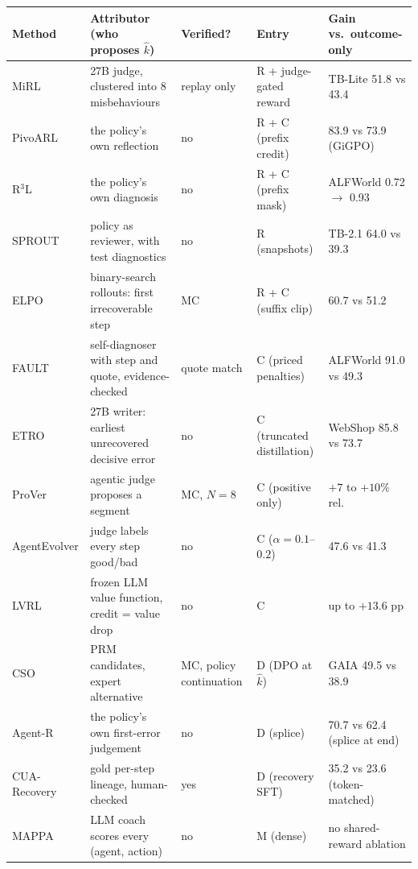 \documentclass[10pt,a4paper]{article}
\begin{document}
\begin{table}[h]\centering\scriptsize
\setlength{\tabcolsep}{3pt}
\begin{tabularx}{\linewidth}{@{}l >{\RaggedRight\hsize=1.05\hsize}X l >{\RaggedRight\hsize=0.95\hsize}X l@{}}\toprule
Method & Attributor (who proposes $\hat k$) & Verified? & Entry & Gain vs.\ outcome-only \\\midrule
MiRL \cite{tian2026mirl} & 27B judge, clustered into 8 misbehaviours & replay only & R + judge-gated reward & TB-Lite 51.8 vs 43.4 \\
PivoARL \cite{guo2026pivoarl} & the policy's own reflection & no & R + C (prefix credit) & 83.9 vs 73.9 (GiGPO) \\
R$^3$L \cite{shi2026r3l} & the policy's own diagnosis & no & R + C (prefix mask) & ALFWorld 0.72 $\to$ 0.93 \\
SPROUT \cite{liu2026sprout} & policy as reviewer, with test diagnostics & no & R (snapshots) & TB-2.1 64.0 vs 39.3 \\
ELPO \cite{liang2026elpo} & binary-search rollouts: first irrecoverable step & MC & R + C (suffix clip) & 60.7 vs 51.2 \\
FAULT \cite{zhu2026fault} & self-diagnoser with step and quote, evidence-checked & quote match & C (priced penalties) & ALFWorld 91.0 vs 49.3 \\
ETRO \cite{huang2026etro} & 27B writer: earliest unrecovered decisive error & no & C (truncated distillation) & WebShop 85.8 vs 73.7 \\
ProVer \cite{jung2026prover} & agentic judge proposes a segment & MC, $N{=}8$ & C (positive only) & $+7$ to $+10\%$ rel. \\
AgentEvolver \cite{agentevolver2025} & judge labels every step good/bad & no & C ($\alpha{=}0.1$--$0.2$) & 47.6 vs 41.3 \\
LVRL \cite{zhu2026lvrl} & frozen LLM value function, credit = value drop & no & C & up to $+13.6$ pp \\
CSO \cite{li2026cso} & PRM candidates, expert alternative & MC, policy continuation & D (DPO at $\hat k$) & GAIA 49.5 vs 38.9 \\
Agent-R \cite{yuan2025agentr} & the policy's own first-error judgement & no & D (splice) & 70.7 vs 62.4 (splice at end) \\
CUA-Recovery \cite{cuarecovery2026} & gold per-step lineage, human-checked & yes & D (recovery SFT) & 35.2 vs 23.6 (token-matched) \\
MAPPA \cite{li2026mappa} & LLM coach scores every (agent, action) & no & M (dense) & no shared-reward ablation \\

\end{tabularx}
\end{table}
\end{document}
